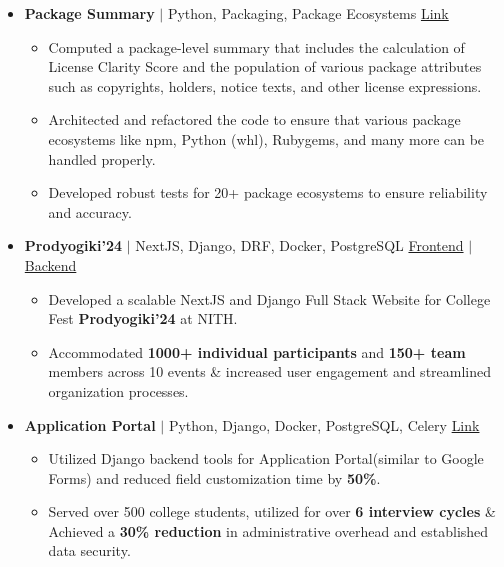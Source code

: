 \documentclass[legalpaper,10.5pt]{article}
\begin{document}
\begin{itemize}[leftmargin=*]
\item \textbf{Package Summary} $|$ Python, Packaging, Package Ecosystems  \hfill \href{https://github.com/aboutcode-org/scancode-toolkit}{Link}
{\small
\begin{itemize}[label=$\diamond$,itemsep=0pt]
    \item Computed a package-level summary that includes the calculation of License Clarity Score and the population of various package attributes such as copyrights, holders, notice texts, and other license expressions.
    \item Architected and refactored the code to ensure that various package ecosystems like npm, Python (whl), Rubygems, and many more can be handled properly.
    \item Developed robust tests for 20+ package ecosystems to ensure reliability and accuracy.
\end{itemize}
}
\item \textbf{Prodyogiki'24} $|$ NextJS, Django, DRF, Docker, PostgreSQL \hfill \href{https://github.com/istenith/prody-frontend}{Frontend} $|$ \href{https://github.com/istenith/prody-backend}{Backend}
{\small
\begin{itemize}[label=$\diamond$]
    \item Developed a scalable NextJS and Django Full Stack Website for College Fest \textbf{Prodyogiki'24} at NITH.
    \item Accommodated \textbf{1000+ individual participants} and \textbf{150+ team} members across 10 events \& increased user engagement and streamlined organization processes.
\end{itemize}
}
\item \textbf{Application Portal} $|$ Python, Django, Docker, PostgreSQL, Celery  \hfill \href{https://github.com/istenith/join.istenith.com}{Link}
{\small
\begin{itemize}[label=$\diamond$]
    \item Utilized Django backend tools for Application Portal(similar to Google Forms) and reduced field customization time by \textbf{50\%}.
    \item Served over 500 college students, utilized for over \textbf{6 interview cycles} \& Achieved a \textbf{30\% reduction} in administrative overhead and established data security.
\end{itemize}
}
\end{itemize}
\end{document}
